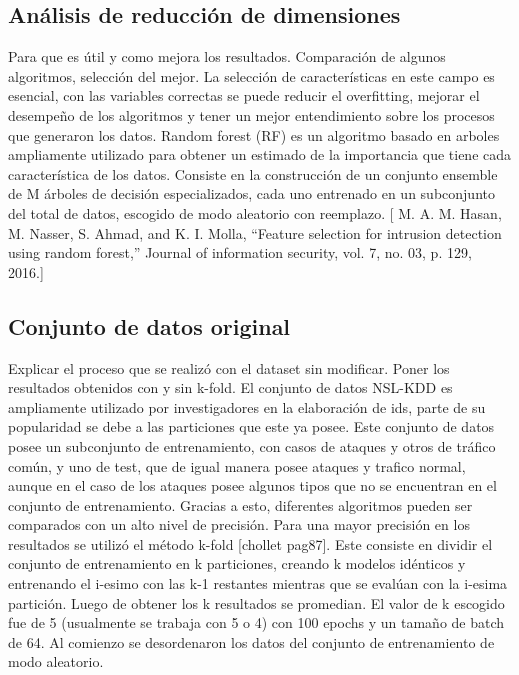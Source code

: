 \subsection{Análisis de reducción de dimensiones}
Para que es útil y como mejora los resultados. Comparación de algunos algoritmos, selección del mejor.
La selección de características en este campo es esencial, con las variables correctas se puede reducir el overfitting, mejorar el desempeño de los algoritmos y tener un mejor entendimiento sobre los procesos que generaron los datos. Random forest (RF) es un algoritmo basado en arboles ampliamente utilizado para obtener un estimado de la importancia que tiene cada característica de los datos. Consiste en la construcción de un conjunto ensemble de M árboles de decisión especializados, cada uno entrenado en un subconjunto del total de datos, escogido de modo aleatorio con reemplazo.
[ M. A. M. Hasan, M. Nasser, S. Ahmad, and K. I. Molla, “Feature selection for intrusion detection using random forest,” Journal of information security, vol. 7, no. 03, p. 129, 2016.]

\subsection{Conjunto de datos original}
Explicar el proceso que se realizó con el dataset sin modificar. Poner los resultados obtenidos con y sin k-fold.
El conjunto de datos NSL-KDD es ampliamente utilizado por investigadores en la elaboración de ids, parte de su popularidad se debe a las particiones que este ya posee. Este conjunto de datos posee un subconjunto de entrenamiento, con casos de ataques y otros de tráfico común, y uno de test, que de igual manera posee ataques y trafico normal, aunque en el caso de los ataques posee algunos tipos que no se encuentran en el conjunto de entrenamiento. Gracias a esto, diferentes algoritmos pueden ser comparados con un alto nivel de precisión.
Para una mayor precisión en los resultados se utilizó el método k-fold [chollet pag87]. Este consiste en dividir el conjunto de entrenamiento en k particiones, creando k modelos idénticos y entrenando el i-esimo con las k-1 restantes mientras que se evalúan con la i-esima partición. Luego de obtener los k resultados se promedian. El valor de k escogido fue de 5 (usualmente se trabaja con 5 o 4) con 100 epochs y un tamaño de batch de 64. Al comienzo se desordenaron los datos del conjunto de entrenamiento de modo aleatorio.


